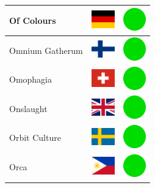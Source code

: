 \documentclass[12pt, a4paper, twoside]{report}
\begin{document}
\begin{center}
\begin{longtable}{|p{5cm}|p{2cm}|p{2cm}|}
Of Colours & \includegraphics[width=1cm]{4x3/de} & \includegraphics[width=1cm]{likes/y} \\ \hline
Omnium Gatherum & \includegraphics[width=1cm]{4x3/fi} & \includegraphics[width=1cm]{likes/y} \\ \hline
Omophagia & \includegraphics[width=1cm]{4x3/ch} & \includegraphics[width=1cm]{likes/y} \\ \hline
Onslaught & \includegraphics[width=1cm]{4x3/gb} & \includegraphics[width=1cm]{likes/y} \\ \hline
Orbit Culture & \includegraphics[width=1cm]{4x3/se} & \includegraphics[width=1cm]{likes/y} \\ \hline
Orca & \includegraphics[width=1cm]{4x3/ph} & \includegraphics[width=1cm]{likes/y} \\ \hline

\end{longtable}
\end{center}
\end{document}
